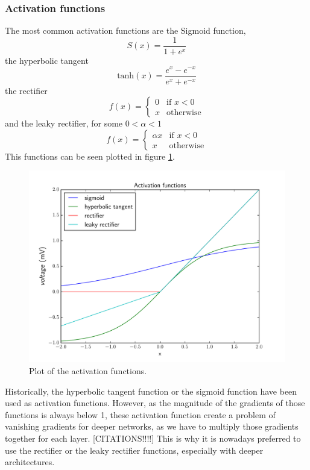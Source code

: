 \documentclass[12pt,a4paper,twoside,openright]{report}
\begin{document}
\subsubsection{Activation functions}
The most common activation functions are the Sigmoid function,
\[S(x) = \frac{1}{1 + e^x}\] the hyperbolic tangent 
\[\textrm{tanh}(x)=\frac{e^x - e^{-x}}{e^x + e^{-x}}\] the rectifier 
\[
f(x) = 
\begin{cases}
	0 & \text{if } x < 0\\
	x & \text{otherwise}
\end{cases}
\]
and the leaky rectifier, for some $0 < \alpha < 1$
\[
f(x) = 
\begin{cases}
	\alpha x & \text{if } x < 0\\
	x & \text{otherwise}
\end{cases}
\]
This functions can be seen plotted in figure \ref{fig:activation_functions}. 
\begin{figure}
	\centering
	\includegraphics[scale=0.6]{activations}
	\caption{Plot of the activation functions.}
	\label{fig:activation_functions}
\end{figure}
Historically, the hyperbolic tangent function or the sigmoid function have been used as activation functions. However, as the magnitude of the gradients of those functions is always below 1, these activation function create a problem of vanishing gradients for deeper networks, as we have to multiply those gradients together for each layer. [CITATIONS!!!!] This is why it is nowadays preferred to use the rectifier or the leaky rectifier functions, especially with deeper architectures.
\end{document}
